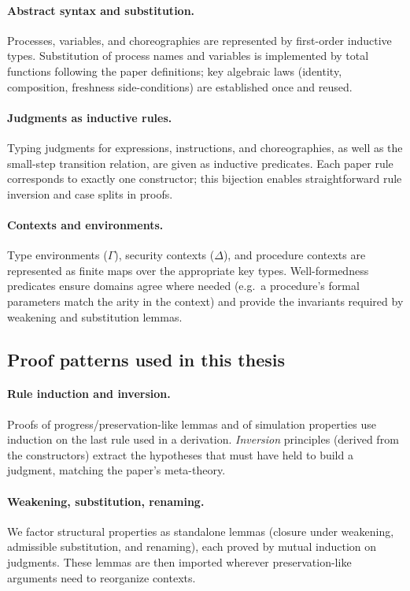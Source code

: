 \documentclass[12pt,a4paper,twoside]{book}
\begin{document}
\paragraph{Abstract syntax and substitution.}
Processes, variables, and choreographies are represented by first-order inductive types.
Substitution of process names and variables is implemented by total functions following the paper definitions; key algebraic laws (identity, composition, freshness side-conditions) are established once and reused.

\paragraph{Judgments as inductive rules.}
Typing judgments for expressions, instructions, and choreographies, as well as the small-step transition relation, are given as inductive predicates.
Each paper rule corresponds to exactly one constructor; this bijection enables straightforward rule inversion and case splits in proofs.

\paragraph{Contexts and environments.}
Type environments (\(\Gamma\)), security contexts (\(\Delta\)), and procedure contexts are represented as finite maps over the appropriate key types.
Well-formedness predicates ensure domains agree where needed (e.g.\ a procedure’s formal parameters match the arity in the context) and provide the invariants required by weakening and substitution lemmas.

\subsection{Proof patterns used in this thesis}
\paragraph{Rule induction and inversion.}
Proofs of progress/preservation-like lemmas and of simulation properties use induction on the last rule used in a derivation.
\emph{Inversion} principles (derived from the constructors) extract the hypotheses that must have held to build a judgment, matching the paper’s meta-theory.

\paragraph{Weakening, substitution, renaming.}
We factor structural properties as standalone lemmas (closure under weakening, admissible substitution, and renaming), each proved by mutual induction on judgments.
These lemmas are then imported wherever preservation-like arguments need to reorganize contexts.
\end{document}
